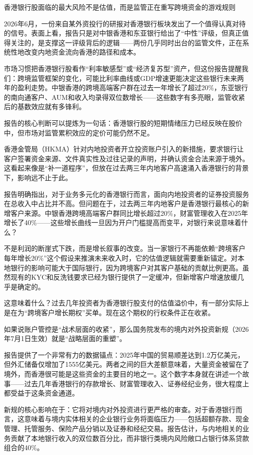 \documentclass[11pt]{ctexart}
\begin{document}
香港银行股面临的最大风险不是估值，而是监管正在重写跨境资金的游戏规则

2026年6月，一份来自某外资投行的研报对香港银行板块发出了一个值得认真对待的信号。表面上看，报告只是对中银香港和东亚银行给出了“中性”评级，但真正值得关注的，是支撑这一评级背后的逻辑——两份几乎同时出台的监管文件，正在系统性地改变内地资金流向香港的路径和成本。

市场习惯把香港银行股看作“利率敏感型”或“经济复苏型”资产，但这份报告提醒我们：跨境监管框架的变化，可能比利率曲线或GDP增速更能决定这些银行未来两年的盈利走势。中银香港的跨境高端客户群在过去一年增长了超过20\%，东亚银行的南向通客户、AUM和收入均录得双位数增长——这些数字有多亮眼，监管收紧后的基数效应就有多锋利。

报告的核心判断可以提炼为一句话：香港银行股的短期情绪压力已经反映在股价中，但市场对监管累积效应的定价可能仍然不足。

香港金管局（HKMA）针对内地投资者开立投资账户引入的新措施，要求银行让客户签署资金来源、文件真实性及过往记录的声明，并确认资金合法来源于境外。这看起来像是“补一道程序”，但放在过去两三年内地客户高速涌入香港银行的背景下，影响远不止于此。

报告明确指出，对于业务多元化的香港银行而言，面向内地投资者的证券投资服务在总收入中占比并不高。但问题在于，过去两三年内地客户是香港银行最核心的新增客户来源。中银香港跨境高端客户群同比增长超过20\%，财富管理收入在2025年增长了40\%——这些增长曲线一旦因为开户门槛提高而变平，对银行来说意味着什么？

不是利润的断崖式下跌，而是增长叙事的改变。当一家银行不再能依赖“跨境客户每年增长20\%”这个假设来推演未来收入时，它的估值逻辑就需要重新锚定。对本地银行的影响可能大于国际银行，因为跨境客户对其客户基础的贡献比例更高。虽然现有的KYC和反洗钱要求已经为银行提供了一定缓冲，但新增客户增速放缓几乎是确定的。

这意味着什么？过去几年投资者为香港银行股支付的估值溢价中，有一部分实际上是在为“跨境客户增长期权”买单。现在这个期权的行权条件正在收紧。

如果说账户管控是“战术层面的收紧”，那么国务院发布的境内对外投资新规（2026年7月1日生效）就是“战略层面的重塑”。

报告提供了一个非常有力的数据锚点：2025年中国的贸易顺差达到1.2万亿美元，但外汇储备仅增加了1555亿美元。两者之间的巨大差额意味着，大量资金被留在了境外，而香港很可能是这些资金的主要目的地之一。这个数字本身就在讲述一个故事——过去几年香港银行的存款增长、财富管理收入、证券经纪业务，很大程度上都受益于这条资金通道。

新规的核心影响在于：它将对境内对外投资进行更严格的审查。对于香港银行而言，这意味着与境内实体相关的企业银行业务将面临压力——包括超额存款、现金管理、托管服务、保险产品分销以及证券和经纪交易。报告估计，与内地相关的业务贡献了本地银行收入的双位数百分比，而非银行类境内风险敞口占银行体系贷款组合的40\%。
\end{document}
